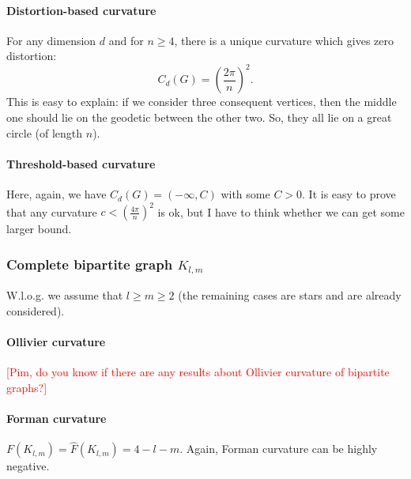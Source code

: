 \documentclass{article} %
\begin{document}
\paragraph{Distortion-based curvature} For any dimension $d$ and for $n \ge 4$, there is a unique curvature which gives zero distortion:
\[
C_d(G) = \left(\frac{2\pi}{n}\right)^2.
\]
This is easy to explain: if we consider three consequent vertices, then the middle one should lie on the geodetic between the other two. So, they all lie on a great circle (of length $n$).

\paragraph{Threshold-based curvature} 
Here, again, we have $C_d(G) = (-\infty, C)$ with some $C>0$. It is easy to prove that any curvature $c < \left(\frac{4\pi}{n}\right)^2$ is ok, but I have to think whether we can get some larger bound. 


\subsubsection{Complete bipartite graph $K_{l,m}$}

W.l.o.g. we assume that $l \ge m \ge 2$ (the remaining cases are stars and are already considered).

\paragraph{Ollivier curvature}  
\textcolor{red}{[Pim, do you know if there are any results about Ollivier curvature of bipartite graphs?]}

\paragraph{Forman curvature} 

$F(K_{l,m}) = \hat F(K_{l,m}) = 4 - l - m$. Again, Forman curvature can be highly negative.

\end{document}
